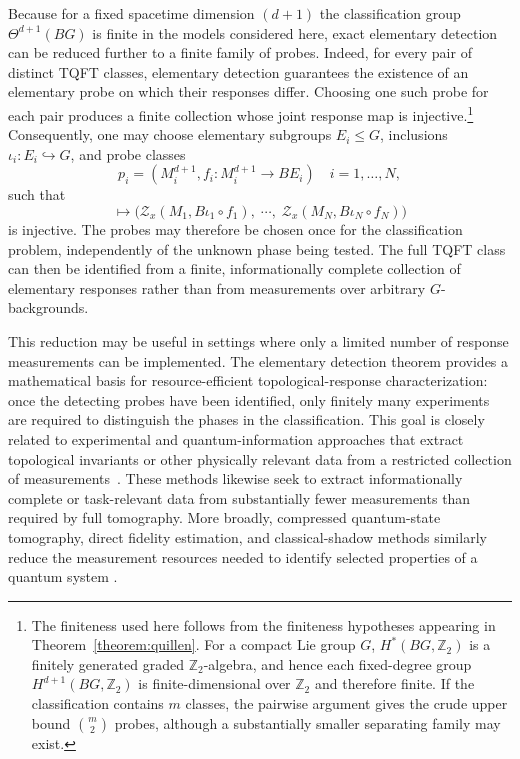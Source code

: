 \documentclass[aps,prx,reprint,superscriptaddress,twocolumn,amsmath,amssymb,amsfonts, nofootinbib]{revtex4-2}
\newcommand{\Z}{\mathbb{Z}}
\theoremstyle{apsstyle}
\begin{document}
Because for a fixed spacetime dimension $(d+1)$ the classification group $\Theta^{d+1}(BG)$ is finite in the models considered here, exact elementary detection can be reduced further to a finite family of probes. Indeed, for every pair of distinct TQFT classes, elementary detection guarantees the existence of an elementary probe on which their responses differ. Choosing one such probe for each pair produces a finite collection whose joint response map is injective.\footnote{The finiteness used here follows from the finiteness hypotheses appearing in Theorem~\ref{theorem:quillen}. For a compact Lie group $G$, $H^*(BG,\Z_2)$ is a finitely generated graded $\Z_2$-algebra, and hence each fixed-degree group $H^{d+1}(BG,\Z_2)$ is finite-dimensional over $\Z_2$  and therefore finite. 
If the classification contains $m$ classes, the pairwise argument gives the crude upper bound $\binom{m}{2}$ probes, although a substantially smaller separating family may exist.} Consequently, one may choose elementary subgroups $E_i\leq G$, inclusions $\iota_i:E_i\hookrightarrow G$, and probe classes
\begin{equation*}
p_i= \left( M_i^{d+1}, f_i:M_i^{d+1}\longrightarrow BE_i \right)
\quad i=1,\ldots,N,
\end{equation*}
such that
\begin{equation}
[x]\longmapsto \big( \mathcal{Z}_x\left(M_1,B\iota_1\circ f_1\right),\;\cdots,\; \mathcal{Z}_x\left(M_N,B\iota_N\circ f_N\right) \big)
\label{eq:finite_elementary_response_map}
\end{equation}
is injective. The probes may therefore be chosen once for the classification problem, independently of the unknown phase being tested. The full TQFT class can then be identified from a finite, informationally complete collection of elementary responses rather than from measurements over arbitrary $G$-backgrounds. 

\bigskip 

This reduction may be useful in settings where only a limited number of response measurements can be implemented. The elementary detection theorem provides a mathematical basis for resource-efficient topological-response characterization: once the detecting probes have been identified, only finitely many experiments are required to distinguish the phases in the classification.  This goal is closely related to experimental and quantum-information approaches that extract topological invariants or other physically relevant data from a restricted collection of measurements~\cite{AidelsburgerEtAl2014,ElbenEtAl2020,SatzingerEtAl2021}. These methods likewise seek to extract informationally complete or task-relevant data from substantially fewer measurements than required by full tomography. More broadly, compressed quantum-state tomography, direct fidelity estimation, and classical-shadow methods similarly reduce the measurement resources needed to identify selected properties of a quantum system \cite{GrossEtAl2010,FlammiaLiu2011,RiofrioEtAl2017, HuangKuengPreskill2020}.
\end{document}
